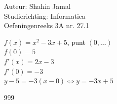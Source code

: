 \documentclass[a4paper]{article}
\begin{document}
  
\noindent \large Auteur: Shahin Jamal \\
\noindent \large Studierichting: Informatica\\
\noindent \large Oefeningenreeks 3A nr. 27.1\\

\medskip

\normalsize

$f(x) = x^2 - 3x + 5$, punt $(0, ...)$\\

$f(0) = 5$\\

$f'(x) = 2x - 3$\\

$f'(0) = -3$\\

$y - 5 = -3(x - 0) \Leftrightarrow y = -3x + 5$\\

\begin{thebibliography}{999}
\end{thebibliography}
\end{document}
